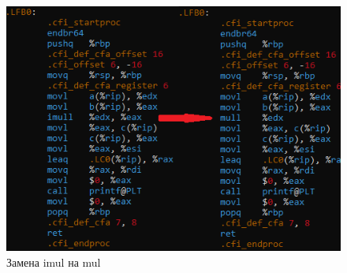\documentclass[a4paper,12pt]{article}
\begin{document}
\begin{figure}[h]
  \centering
  \includegraphics[width=0.8\linewidth]{images/asm0_5.png}
  \caption{Замена imul на mul}
\end{figure}
\end{document}
